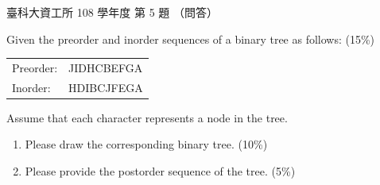 \begin{pastexam}[label={px:ntust-108-ice-05}]{臺科大資工所 108 學年度 第 5 題}
（問答）

Given the preorder and inorder sequences of a binary tree as follows: (15\%)

\begin{tabular}{ll}
Preorder: & JIDHCBEFGA \\
Inorder: & HDIBCJFEGA
\end{tabular}

Assume that each character represents a node in the tree.
\begin{enumerate}[label=(\alph*)]
\item Please draw the corresponding binary tree. (10\%)
\item Please provide the postorder sequence of the tree. (5\%)
\end{enumerate}
\end{pastexam}

